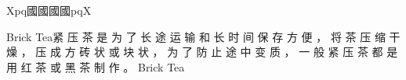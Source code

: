 


\begin{multicols}{3}
Xpq{\cn{}國國國國}pqX

Brick Tea{\cn{}紧    压 茶 是 为 了 长 途 运 输 和 长 时 间 保 存 方 便 ， 将 茶 压 缩 干 燥 ， 压 成 方 砖 状 或 块 状 ， 为 了 防 止 途 中 变 质 ， 一 般 紧 压 茶 都 是 用 红 茶 或 黑 茶 制 作 。
}Brick Tea
\end{multicols}


